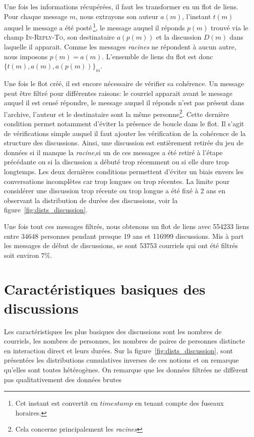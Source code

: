 Une fois les informations récupérées, il faut les transformer en un flot de liens.
Pour chaque message $m$, nous extrayons son auteur $a(m)$, l'instant $t(m)$ auquel le message a été posté\,\footnote{Cet instant est convertit en $timestamp$ en tenant compte des fuseaux horaires.}, le message auquel il réponds $p(m)$ trouvé via le champ \textsc{In-Reply-To}, son destinataire $a(p(m))$ et la discussion $D(m)$ dans laquelle il apparait.
Comme les messages \emph{racines} ne répondent à aucun autre, nous imposons $p(m)=a(m)$.
L'ensemble de liens du flot est donc $\{t(m),a(m),a(p(m))\}_m$.

Une fois le flot créé, il est encore nécessaire de vérifier sa cohérence.
Un message peut être filtré pour différentes raisons: le courriel apparait avant le message auquel il est censé répondre, le message auquel il réponds n'est pas présent dans l'archive, l'auteur et le destinataire sont la même personne\footnote{Cela concerne principalement les \emph{racines}}.
Cette dernière condition permet notamment d'éviter la présence de boucle dans le flot.
Il s'agit de vérifications simple auquel il faut ajouter les vérification de la cohérence de la structure des discussions.
Ainsi, une discussion est entièrement retirée du jeu de données si il manque la \emph{racine},si un de ces messages a été retiré à l'étape précédante ou si la discussion a débuté trop récemment ou si elle dure trop longtemps.
Les deux dernières conditions permettent d'éviter un biais envers les conversations incomplètes car trop longues ou trop récentes.
La limite pour considérer une discussion trop récente ou trop longue a été fixé à 2 ans en observant la distribution de durées des discussions, voir la figure~\ref{fig:dists_discussion}.

Une fois tout ces messages filtrés, nous obtenons un flot de liens avec 554233 liens entre 34648 personnes pendant presque 19 ans et 116999 discussions.
Mis à part les messages de début de discussions, se sont 53753 courriels qui ont été filtrés soit environ $7\%$.

\section{Caractéristiques basiques des discussions}

Les caractéristiques les plus basiques des discussions sont les nombres de courriels, les nombres de personnes, les nombres de paires de personnes distincte en interaction direct et leurs durées.
Sur la figure~\ref{fig:dists_discussion}, sont présentées les distributions cumulatives inverses de ces notions et on remarque qu'elles sont toutes hétérogènes.
On remarque que les données filtrées ne diffèrent pas qualitativement des données brutes

